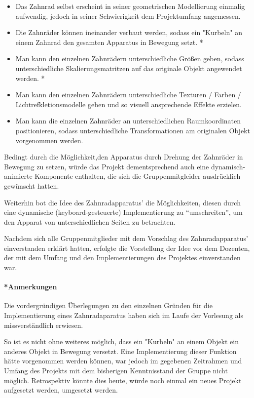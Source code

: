 \documentclass{article}
\begin{document}
\begin{itemize}
    \item Das Zahnrad selbst erscheint in seiner geometrischen Modellierung einmalig aufwendig, jedoch in seiner Schwierigkeit dem Projektumfang angemessen. 
    \item Die Zahnräder können ineinander verbaut werden, sodass ein "Kurbeln" an einem Zahnrad den gesamten Apparatus in Bewegung setzt. *
    \item Man kann den einzelnen Zahnrädern unterschiedliche Größen geben, sodass unterschiedliche Skalierungsmatritzen auf das originale Objekt angewendet werden. *
    \item Man kann den einzelnen Zahnrädern unterschiedliche Texturen / Farben / Lichtrefkletionsmodelle geben und so visuell ansprechende Effekte erzielen. 
    \item Man kann die einzelnen Zahnräder an unterschiedlichen Raumkoordinaten positionieren, sodass unterschiedliche Transformationen am originalen Objekt vorgenommen werden. 
\end{itemize}

Bedingt durch die Möglichkeit,den Apparatus durch Drehung der Zahnräder in Bewegung zu setzen, würde das Projekt dementsprechend auch eine dynamisch-animierte Komponente enthalten, die sich die Gruppenmitgleider ausdrücklich gewünscht hatten. 

Weiterhin bot die Idee des Zahnradapparatus' die Möglichkeiten, diesen durch eine dynamische (keyboard-gesteuerte) Implementierung zu \enquote{umschreiten}, um den Apparat von unterschiedlichen Seiten zu betrachten. 

Nachdem sich alle Gruppenmitglieder mit dem Vorschlag des Zahnradapparatus' einverstanden erklärt hatten, erfolgte die Vorstellung der Idee vor dem Dozenten, der mit dem Umfang und den Implementierungen des Projektes einverstanden war. 



\paragraph{*Anmerkungen}
Die vordergründigen Überlegungen zu den einzelnen Gründen für die Implementierung eines Zahnradaparatus haben sich im Laufe der Vorlesung als missverständlich erwiesen. 

So ist es nicht ohne weiteres möglich, dass ein "Kurbeln" an einem Objekt ein anderes Objekt in Bewegung versetzt. 
Eine Implementierung dieser Funktion hätte vorgenommen werden können, war jedoch im gegebenen Zeitrahmen und Umfang des Projekts mit dem bisherigen Kenntnisstand der Gruppe nicht möglich. 
Retrospektiv könnte dies heute, würde noch einmal ein neues Projekt aufgesetzt werden, umgesetzt werden. 
\end{document}
